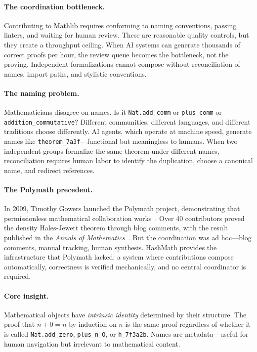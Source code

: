 \documentclass[11pt]{article}
\theoremstyle{definition}
\theoremstyle{plain}
\theoremstyle{remark}
\begin{document}
\paragraph{The coordination bottleneck.}
Contributing to Mathlib requires conforming to naming conventions, passing linters,
and waiting for human review.
These are reasonable quality controls, but they create a throughput ceiling.
When AI systems can generate thousands of correct proofs per hour, the review queue
becomes the bottleneck, not the proving.
Independent formalizations cannot compose without reconciliation of names, import paths,
and stylistic conventions.

\paragraph{The naming problem.}
Mathematicians disagree on names.
Is it \texttt{Nat.add\_comm} or \texttt{plus\_comm} or \texttt{addition\_commutative}?
Different communities, different languages, and different traditions choose differently.
AI agents, which operate at machine speed, generate names like \texttt{theorem\_7a3f}---functional
but meaningless to humans.
When two independent groups formalize the same theorem under different names, reconciliation
requires human labor to identify the duplication, choose a canonical name, and redirect references.

\paragraph{The Polymath precedent.}
In 2009, Timothy Gowers launched the Polymath project, demonstrating that permissionless
mathematical collaboration works~\cite{gowers2009}.
Over 40 contributors proved the density Hales-Jewett theorem through blog comments, with the
result published in the \emph{Annals of Mathematics}~\cite{polymath2012}.
But the coordination was ad hoc---blog comments, manual tracking, human synthesis.
HashMath provides the infrastructure that Polymath lacked: a system where contributions
compose automatically, correctness is verified mechanically, and no central coordinator is required.

\paragraph{Core insight.}
Mathematical objects have \emph{intrinsic identity} determined by their structure.
The proof that $n + 0 = n$ by induction on $n$ is the same proof regardless of whether
it is called \texttt{Nat.add\_zero}, \texttt{plus\_n\_O}, or \texttt{h\_7f3a2b}.
Names are metadata---useful for human navigation but irrelevant to mathematical content.
\end{document}
